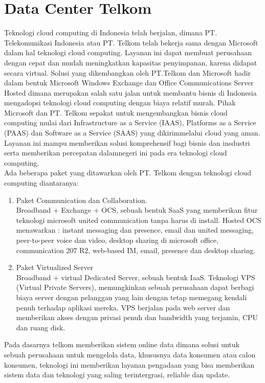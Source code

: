 \section{Data Center Telkom}
\tab Teknologi cloud computing di Indonesia telah berjalan, dimana PT. Telekomunikasi Indonesia atau PT. Telkom telah bekerja sama dengan Microsoft dalam hal teknologi cloud computing. Layanan ini dapat membuat perusahaan dengan cepat dan mudah meningkatkan kapasitas penyimpanan, karena didapat secara virtual. Solusi yang dikembangkan oleh PT.Telkom dan Microsoft hadir dalam bentuk Microsoft Windows Exchange dan Office Communications Server Hosted dimana merupakan salah satu jalan untuk membantu bisnis di Indonesia mengadopsi teknologi cloud computing dengan biaya relatif murah. Pihak Microsoft dan PT. Telkom sepakat untuk mengembangkan bisnis cloud  computing  mulai  dari Infrastructure as a Service (IAAS), Platforms as a Service (PAAS) dan Software as a Service (SAAS) yang dikirimmelalui cloud yang aman.\\
Layanan ini mampu memberikan solusi komprehensif bagi bisnis dan insdustri  serta memberikan percepatan dalamnegeri ini pada era teknologi  cloud computing.\\
Ada  beberapa  paket  yang  ditawarkan  oleh  PT.  Telkom  dengan  teknologi   cloud  computing
diantaranya:
\begin{enumerate}
\item Paket Communication dan  Collaboration.\\
Broadband + Exchange + OCS, sebuah bentuk SaaS yang memberikan fitur teknologi microsoft united communication tanpa harus di install. Hosted OCS menawarkan  :  instant messaging dan presence, email dan united messaging, peer-to-peer voice dan video, desktop sharing di microsoft office, communication 207 R2, web-based IM, email, presence dan desktop sharing.
\item Paket  Virtualized Server\\
Broadband + virtual Dedicated Server, sebuah bentuk IaaS. Teknologi VPS (Virtual Private Servers), memungkinkan sebuah perusahaan dapat berbagi  biaya  server dengan pelanggan yang lain dengan tetap memegang kendali penuh terhadap aplikasi mereka. VPS berjalan pada web server dan memberikan akses dengan privasi  penuh dan bandwidth yang terjamin, CPU dan ruang disk.
\end{enumerate}
Pada dasarnya telkom memberikan sistem online data dimana solusi untuk sebuah perusahaan untuk mengelola data, khususnya data konsumen atau calon konsumen, teknologi ini memberikan layanan pengadaan yang bisa memberikan sistem data dan teknologi yang saling terintergrasi, reliable dan update.\\
